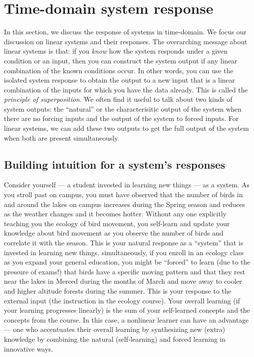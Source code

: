 \documentclass{ee102_notes}
\begin{document}
\section{Time-domain system response}
In this section, we discuss the response of systems in time-domain. We focus our discussion on linear systems and their responses. The overarching message about linear systems is that: if you \emph{know} how the system responds under a given condition or an input, then you can construct the system output if any linear combination of the known conditions occur. In other words, you can use the isolated system response to obtain the output to a new input that is a linear combination of the inputs for which you have the data already. This is called the \emph{principle of superposition}. We often find it useful to talk about two kinds of system outputs: the ``natural'' or the characterisitic output of the system when there are no forcing inputs and the output of the system to forced inputs. For linear systems, we can add these two outputs to get the full output of the system when both are present simultaneously.

\subsection{Building intuition for a system's responses}
Consider yourself --- a student invested in learning new things --- as a system. As you stroll past on campus, you must have observed that the number of birds in and around the lakes on campus increases during the Spring season and reduces as the weather changes and it becomes hotter. Without any one explicitly teaching you the ecology of bird movement, you self-learn and update your knowledge about bird movement as you observe the number of birds and correlate it with the season. This is your natural response as a ``system'' that is invested in learning new things. simultaneously, if you enroll in an ecology class as you expand your general education, you might be ``forced'' to learn (due to the pressure of exams!) that birds have a specific moving pattern and that they rest near the lakes in Merced during the months of March and move away to cooler and higher altitude forests during the summer. This is your response to the external input (the instruction in the ecology course). Your overall learning (if your learning progresses linearly) is the sum of your self-learned concepts and the concepts from the course. In this case, a nonlinear learner can have an advantage --- one who accentuates their overall learning by synthesizing new (extra) knowledge by combining the natural (self-learning) and forced learning in innovative ways. 
\end{document}
